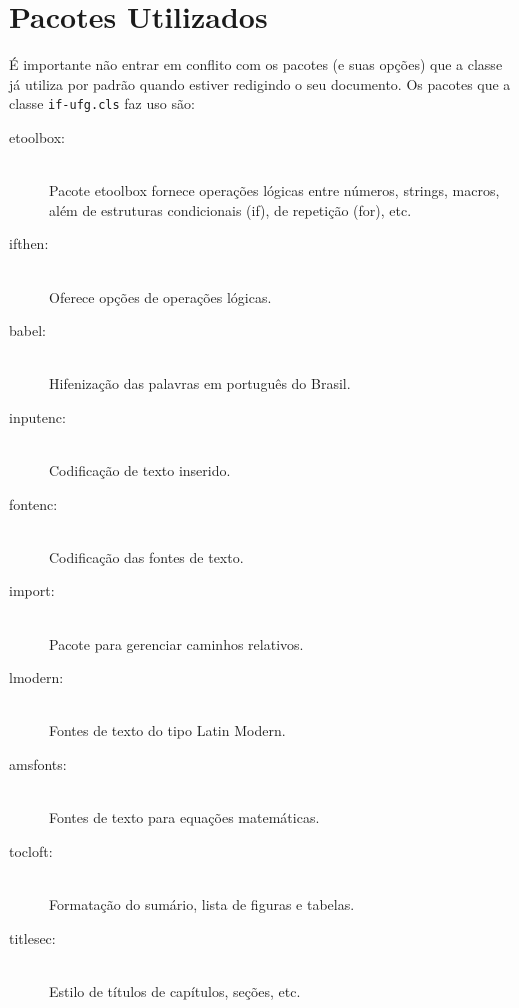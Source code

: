 \section{Pacotes Utilizados}

É importante não entrar em conflito com os pacotes (e suas opções) que a classe já utiliza por padrão quando estiver redigindo o seu documento. Os pacotes que a classe \texttt{if-ufg.cls} faz uso são:

\begin{description}
\item[etoolbox:]\hfill\\
Pacote etoolbox fornece operações lógicas entre números, strings, macros, além de
estruturas condicionais (if), de repetição (for), etc.

\item[ifthen:]\hfill\\
Oferece opções de operações lógicas.

\item[babel:]\hfill\\
Hifenização das palavras em português do Brasil.

\item[inputenc:]\hfill\\
Codificação de texto inserido.

\item[fontenc:]\hfill\\
Codificação das fontes de texto.

\item[import:]\hfill\\
Pacote para gerenciar caminhos relativos.

\item[lmodern:]\hfill\\
Fontes de texto do tipo Latin Modern.

\item[amsfonts:]\hfill\\
Fontes de texto para equações matemáticas.

\item[tocloft:]\hfill\\
Formatação do sumário, lista de figuras e tabelas.

\item[titlesec:]\hfill\\
Estilo de títulos de capítulos, seções, etc.


\end{description}
